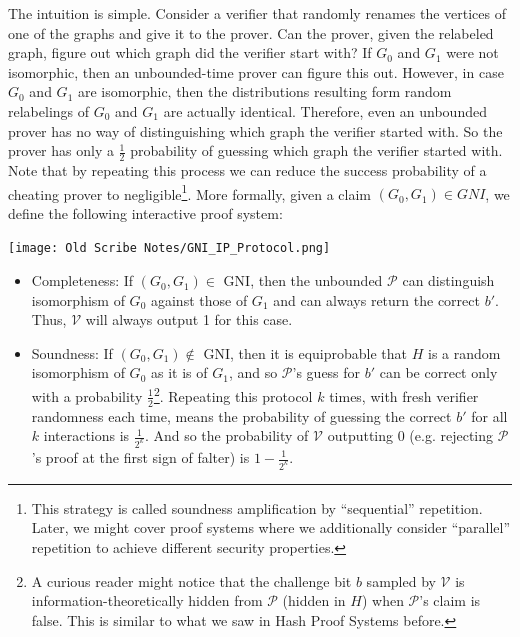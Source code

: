 \documentclass[12pt]{tufte-book}
\begin{document}
The intuition is simple. Consider a verifier that randomly renames the vertices of one of the graphs and give it to the prover. Can the prover, given the relabeled graph, figure out which graph did the verifier start with?  If $G_0$ and $G_1$ were not isomorphic, then an unbounded-time prover can figure this out. However, in case $G_0$ and $G_1$ {are} isomorphic, then the distributions resulting form random relabelings of $G_0$ and $G_1$ are actually identical. Therefore, even an unbounded prover has no way of distinguishing which graph the verifier started with. So the prover has only a $\frac{1}{2}$ probability of guessing which graph the verifier started with. Note that by repeating this process we can reduce the success probability of a cheating prover to negligible\footnote{This strategy is called soundness amplification by ``sequential'' repetition. Later, we might cover proof systems where we additionally consider ``parallel'' repetition to achieve different security properties.}. More formally, given a claim $(G_0,G_1)\in GNI$, we define the following interactive proof system:



		\begin{center}
			\texttt{[image: Old Scribe Notes/GNI\_IP\_Protocol.png]}
		\end{center}

		\begin{itemize}
			\item Completeness: If $(G_0,G_1)\in$ GNI, then the unbounded $\mathcal{P}$ can distinguish isomorphism of $G_0$ against those of $G_1$ and can always return the correct $b'$.  Thus, $\mathcal{V}$ will always output 1 for this case.
			\item Soundness: If $(G_0,G_1)\notin$ GNI, then it is equiprobable that $H$ is a random isomorphism of $G_0$ as it is of $G_1$, and so $\mathcal{P}$'s guess for $b'$ can be correct only with a probability $\frac{1}{2}$\footnote{A curious reader might notice that the challenge bit $b$ sampled by $\mathcal{V}$ is information-theoretically hidden from $\mathcal{P}$ (hidden in $H$) when $\mathcal{P}$'s claim is false. This is similar to what we saw in Hash Proof Systems before.}.  Repeating this protocol $k$ times, with fresh verifier randomness each time, means the probability of guessing the correct $b'$ for all $k$ interactions is $\frac{1}{2^k}$.  And so the probability of $\mathcal{V}$ outputting $0$ (e.g. rejecting $\mathcal{P}$'s proof at the first sign of falter) is $1-\frac{1}{2^k}$.  

		\end{itemize}
\end{document}
